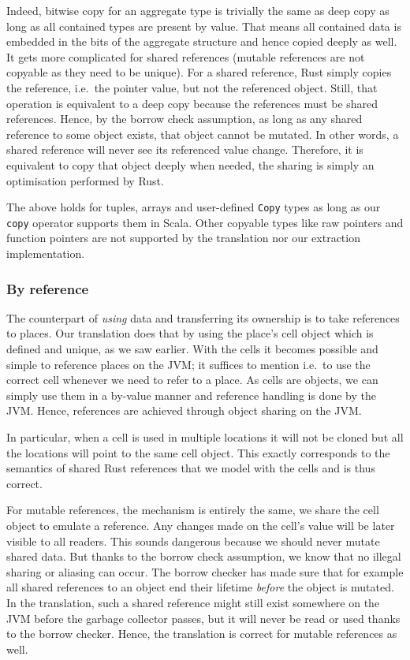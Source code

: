 Indeed, bitwise copy for an aggregate type is trivially the same as deep
copy as long as all contained types are present by value. That means all
contained data is embedded in the bits of the aggregate structure and
hence copied deeply as well. It gets more complicated for shared
references (mutable references are not copyable as they need to be
unique). For a shared reference, Rust simply copies the reference,
i.e.~the pointer value, but not the referenced object. Still, that
operation is equivalent to a deep copy because the references must be
shared references. Hence, by the borrow check assumption, as long as any
shared reference to some object exists, that object cannot be mutated.
In other words, a shared reference will never see its referenced value
change. Therefore, it is equivalent to copy that object deeply when
needed, the sharing is simply an optimisation performed by Rust.

The above holds for tuples, arrays and user-defined
\passthrough{\lstinline!Copy!} types as long as our
\passthrough{\lstinline!copy!} operator supports them in Scala. Other
copyable types like raw pointers and function pointers are not supported
by the translation nor our extraction implementation.

\subsubsection{By reference}

The counterpart of \emph{using} data and transferring its ownership is
to take references to places. Our translation does that by using the
place's cell object which is defined and unique, as we saw earlier. With
the cells it becomes possible and simple to reference places on the JVM;
it suffices to mention i.e.~to use the correct cell whenever we need to
refer to a place. As cells are objects, we can simply use them in a
by-value manner and reference handling is done by the JVM. Hence,
references are achieved through object sharing on the JVM.

In particular, when a cell is used in multiple locations it will not be
cloned but all the locations will point to the same cell object. This
exactly corresponds to the semantics of shared Rust references that we
model with the cells and is thus correct.

For mutable references, the mechanism is entirely the same, we share the
cell object to emulate a reference. Any changes made on the cell's value
will be later visible to all readers. This sounds dangerous because we
should never mutate shared data. But thanks to the borrow check
assumption, we know that no illegal sharing or aliasing can occur. The
borrow checker has made sure that for example all shared references to
an object end their lifetime \emph{before} the object is mutated. In the
translation, such a shared reference might still exist somewhere on the
JVM before the garbage collector passes, but it will never be read or
used thanks to the borrow checker. Hence, the translation is correct for
mutable references as well.




